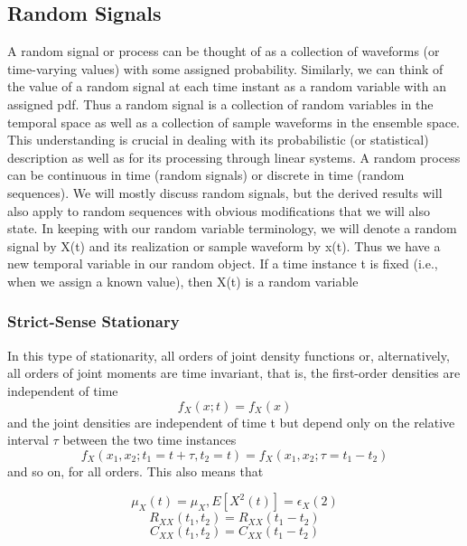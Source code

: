 \documentclass{article}
\begin{document}
\subsection{Random Signals}
A random signal or process can be thought of as a collection of waveforms
(or time-varying values) with some assigned probability. Similarly, we can
think of the value of a random signal at each time instant as a random
variable with an assigned pdf. Thus a random signal is a collection of
random variables in the temporal space as well as a collection of sample waveforms in the ensemble space. This understanding is crucial in
dealing with its probabilistic (or statistical) description as well as for its
processing through linear systems.
A random process can be continuous in time (random signals) or discrete in time (random sequences). We will mostly discuss random signals,
but the derived results will also apply to random sequences with obvious
modifications that we will also state. In keeping with our random variable
terminology, we will denote a random signal by X(t) and its realization or
sample waveform by x(t). Thus we have a new temporal variable in our
random object.
If a time instance t is fixed (i.e., when we assign a known value), then
X(t) is a random variable
\subsubsection{Strict-Sense Stationary}
In this type of stationarity, all orders of joint density functions or,
alternatively, all orders of joint moments are time invariant, that is, the
first-order densities are independent of time
\begin{equation}
f_X(x;t)=f_X(x)
\end{equation}
and the joint densities are independent of time t but depend only on the
relative interval $\tau$ between the two time instances
\begin{equation}
f_X(x_1,x_2;t_1=t+\tau,t_2=t)=f_X(x_1,x_2;\tau=t_1-t_2)
\end{equation}
and so on, for all orders. This also means that
\begin{center}
\begin{equation}
\mu_X(t) = \mu_X, E[X^2(t)]=\epsilon_X(2)
\end{equation}
\begin{equation}
R_{XX}(t_1,t_2)=R_{XX}(t_1-t_2)
\end{equation}
\begin{equation}
C_{XX}(t_1,t_2)=C_{XX}(t_1-t_2)    
\end{equation}
\end{center}
\end{document}

